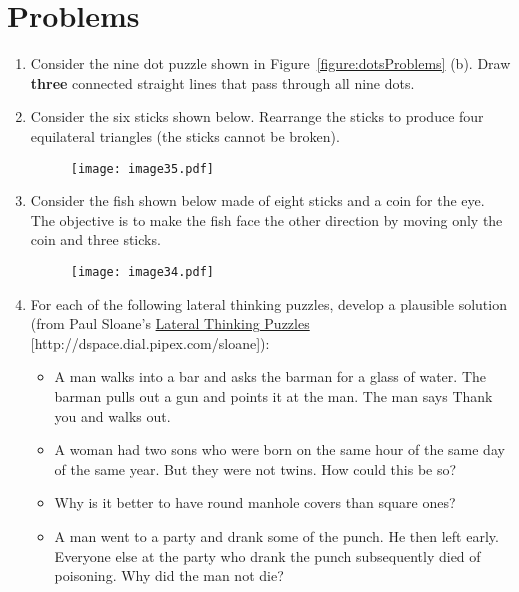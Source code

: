 \section{Problems}
\label{section:conceptGenProblems}

\begin{enumerate}
\def\labelenumi{\arabic{enumi}.}
\item
  Consider the nine dot puzzle shown in Figure~\ref{figure:dotsProblems} (b). Draw
  \textbf{three} connected straight lines that pass through all nine
  dots.

\item
  Consider the six sticks shown below. Rearrange the sticks to produce
  four equilat­eral triangles (the sticks cannot be broken).
  
  \begin{figure}[h]
\texttt{[image: image35.pdf]}
\label{figure:sixSticks}
\end{figure}

\item
  Consider the fish shown below made of eight sticks and a coin for the
  eye. The objective is to make the fish face the other direction by
  moving only the coin and three sticks.

\begin{figure}[h]
\texttt{[image: image34.pdf]}
\label{figure:fishStickFigure}
\end{figure}

\item
  For each of the following lateral thinking puzzles, develop a
  plausible solution (from Paul Sloane's \ul{Lateral Thinking Puzzles}
  {[}http://dspace.dial.pipex.com/sloane{]}):

\begin{itemize}
\item
  A man walks into a bar and asks the barman for a glass of water. The
  barman pulls out a gun and points it at the man. The man says
  \textquotesingle Thank you\textquotesingle{} and walks out.
\item
  A woman had two sons who were born on the same hour of the same day of
  the same year. But they were not twins. How could this be so?
\item
  Why is it better to have round manhole covers than square ones?
\item
  A man went to a party and drank some of the punch. He then left early.
  Everyone else at the party who drank the punch subsequently died of
  poisoning. Why did the man not die?
\end{itemize}


\end{enumerate}
